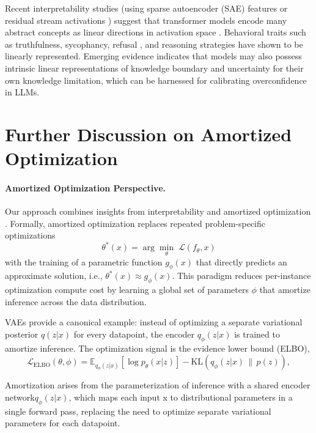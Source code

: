 \documentclass{article} %
\begin{document}
Recent interpretability studies (using sparse autoencoder (SAE) features \citep{ferrando2025entity} or residual stream activations \citep{calibratinguncertaintylinear}) suggest that transformer models encode many abstract concepts as linear directions in activation space \citep{nanda2023emergent, mikolov2013linguistic, park2023linear, arditi2024refusal, yang2025interpretability}. Behavioral traits such as truthfulness, sycophancy, refusal \citep{arditi2024refusal}, and reasoning strategies have shown to be linearly represented. Emerging evidence indicates that models may also possess intrinsic linear representations of knowledge boundary \citep{ferrando2025entity} and uncertainty \citep{calibratinguncertaintylinear} for their own knowledge limitation, which can be harnessed for calibrating overconfidence in LLMs.

\section{Further Discussion on Amortized Optimization}
\label{app:amortized_optimization}



\paragraph{Amortized Optimization Perspective.} 
Our approach combines insights from interpretability and amortized optimization \citep{kingma2013auto, rezende2014stochastic, gershman2014amortized}. 
Formally, amortized optimization replaces repeated problem-specific optimizations
\[
    \theta^*(x) = \arg\min_{\theta} \; \mathcal{L}(f_\theta, x)
\]
with the training of a parametric function $g_\phi(x)$ that directly predicts an approximate solution, i.e., $\theta^*(x) \approx g_\phi(x)$. 
This paradigm reduces per-instance optimization compute cost by learning a global set of parameters $\phi$ that amortize inference across the data distribution. 

VAEs provide a canonical example: instead of optimizing a separate variational posterior $q(z|x)$ for every datapoint, the encoder $q_\phi(z|x)$ is trained to amortize inference. 
The optimization signal is the evidence lower bound (ELBO),
\[
    \mathcal{L}_{\text{ELBO}}(\theta,\phi) = 
    \mathbb{E}_{q_\phi(z|x)}[\log p_\theta(x|z)] 
    - \mathrm{KL}(q_\phi(z|x)\,\|\,p(z)),
\]

Amortization arises from the parameterization of inference with a shared encoder network$q_\phi(z|x)$,
which maps each input x to distributional parameters in a single forward pass, replacing the need to
optimize separate variational parameters for each datapoint. 
\end{document}
